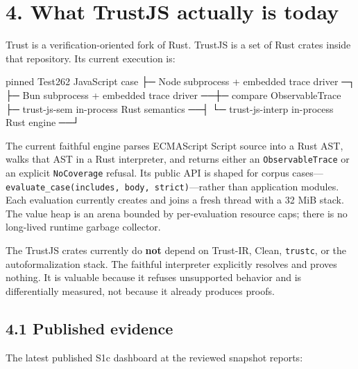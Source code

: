 \documentclass[
  10pt,
  letterpaper,
]{article}
\newenvironment{Shaded}{\begin{snugshade}}{\end{snugshade}}
\newcommand{\NormalTok}[1]{#1}
\begin{document}
\section{4. What TrustJS actually is
today}\label{4-what-trustjs-actually-is-today}

Trust is a verification-oriented fork of Rust. TrustJS is a set of Rust
crates inside that repository. Its current execution is:

\begin{Shaded}
\begin{Highlighting}[]
\NormalTok{pinned Test262 JavaScript case}
\NormalTok{├─ Node subprocess + embedded trace driver ─┐}
\NormalTok{├─ Bun subprocess + embedded trace driver ──┼─ compare ObservableTrace}
\NormalTok{├─ trust{-}js{-}sem in{-}process Rust semantics ──┤}
\NormalTok{└─ trust{-}js{-}interp in{-}process Rust engine ──┘}
\end{Highlighting}
\end{Shaded}

The current faithful engine parses ECMAScript Script source into a Rust
AST, walks that AST in a Rust interpreter, and returns either an
\texttt{ObservableTrace} or an explicit \texttt{NoCoverage} refusal. Its
public API is shaped for corpus
cases---\texttt{evaluate\_case(includes,\ body,\ strict)}---rather than
application modules. Each evaluation currently creates and joins a fresh
thread with a 32 MiB stack. The value heap is an arena bounded by
per-evaluation resource caps; there is no long-lived runtime garbage
collector.

The TrustJS crates currently do \textbf{not} depend on Trust-IR, Clean,
\texttt{trustc}, or the autoformalization stack. The faithful
interpreter explicitly resolves and proves nothing. It is valuable
because it refuses unsupported behavior and is differentially measured,
not because it already produces proofs.

\subsection{4.1 Published evidence}\label{41-published-evidence}

The latest published S1c dashboard at the reviewed snapshot reports:
\end{document}
